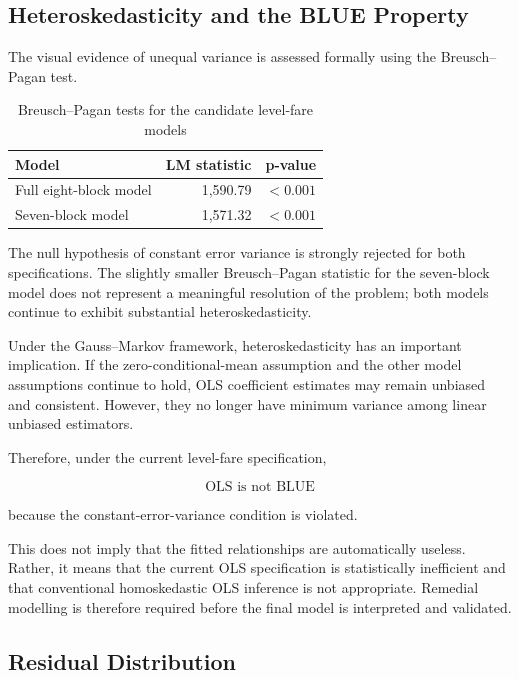 \documentclass[11pt,a4paper]{article}
\begin{document}
\subsection{Heteroskedasticity and the BLUE Property}

The visual evidence of unequal variance is assessed formally using the Breusch--Pagan test.

\begin{table}[H]
\centering
\caption{Breusch--Pagan tests for the candidate level-fare models}
\label{tab:bp-level-models}
\begin{tabular}{lrr}
\toprule
\textbf{Model} & \textbf{LM statistic} & \textbf{p-value} \\
\midrule
Full eight-block model & 1,590.79 & $<0.001$ \\
Seven-block model & 1,571.32 & $<0.001$ \\
\bottomrule
\end{tabular}
\end{table}

The null hypothesis of constant error variance is strongly rejected for both specifications. The slightly smaller Breusch--Pagan statistic for the seven-block model does not represent a meaningful resolution of the problem; both models continue to exhibit substantial heteroskedasticity.

Under the Gauss--Markov framework, heteroskedasticity has an important implication. If the zero-conditional-mean assumption and the other model assumptions continue to hold, OLS coefficient estimates may remain unbiased and consistent. However, they no longer have minimum variance among linear unbiased estimators.

Therefore, under the current level-fare specification,

\[
\boxed{\text{OLS is not BLUE}}
\]

because the constant-error-variance condition is violated.

This does not imply that the fitted relationships are automatically useless. Rather, it means that the current OLS specification is statistically inefficient and that conventional homoskedastic OLS inference is not appropriate. Remedial modelling is therefore required before the final model is interpreted and validated.

\subsection{Residual Distribution}
\end{document}
